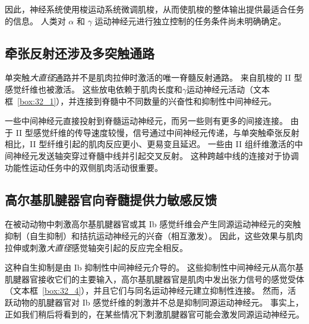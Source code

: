 因此，神经系统使用梭运动系统微调肌梭，从而使肌梭的整体输出提供最适合任务的信息。
人类对 $ \alpha $ 和 $ \gamma $ 运动神经元进行独立控制的任务条件尚未明确确定。



\subsection{牵张反射还涉及多突触通路}

单突触\textit{大直径}通路并不是肌肉拉伸时激活的唯一脊髓反射通路。
来自肌梭的 II 型感觉纤维也被激活。
这些放电依赖于肌肉长度和$ \gamma $运动神经元活动（文本框~\ref{box:32_1}），并连接到脊髓中不同数量的兴奋性和抑制性中间神经元。


一些中间神经元直接投射到脊髓运动神经元，而另一些则有更多的间接连接。
由于 II 型感觉纤维的传导速度较慢，信号通过中间神经元传递，与单突触牵张反射相比，II 型纤维引起的肌肉反应更小、更易变且延迟。
一些由 II 组纤维激活的中间神经元发送轴突穿过脊髓中线并引起交叉反射。
这种跨越中线的连接对于协调功能性运动任务中的双侧肌肉活动很重要。



\subsection{高尔基肌腱器官向脊髓提供力敏感反馈}

在被动动物中刺激高尔基肌腱器官或其 Ib 感觉纤维会产生同源运动神经元的突触抑制（自生抑制）和拮抗运动神经元的兴奋（相互激发）。
因此，这些效果与肌肉拉伸或刺激\textit{大直径}感觉轴突引起的反应完全相反。


这种自生抑制是由 Ib 抑制性中间神经元介导的。
这些抑制性中间神经元从高尔基肌腱器官接收它们的主要输入，高尔基肌腱器官是肌肉中发出张力信号的感觉受体（文本框~\ref{box:32_4}），并且它们与同名运动神经元建立抑制性连接。
然而，活跃动物的肌腱器官对 Ib 感觉纤维的刺激并不总是抑制同源运动神经元。
事实上，正如我们稍后将看到的，在某些情况下刺激肌腱器官可能会激发同源运动神经元。



